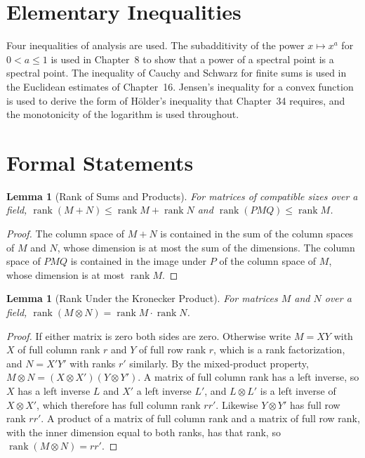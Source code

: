 \documentclass[11pt,letterpaper]{report}
\theoremstyle{plain}
\newtheorem{lemma}[theorem]{Lemma}
\theoremstyle{definition}
\theoremstyle{remark}
\begin{document}
\section{Elementary Inequalities}

Four inequalities of analysis are used. The subadditivity of the power $x\mapsto x^a$ for $0<a\le1$ is used in Chapter~8 to show that a power of a spectral point is a spectral point. The inequality of Cauchy and Schwarz for finite sums is used in the Euclidean estimates of Chapter~16. Jensen's inequality for a convex function is used to derive the form of H\"older's inequality that Chapter~34 requires, and the monotonicity of the logarithm is used throughout.

\section{Formal Statements}

\begin{lemma}[Rank of Sums and Products]\label{lem:ranksum}
For matrices of compatible sizes over a field, $\operatorname{rank}(M+N)\le\operatorname{rank}M+\operatorname{rank}N$ and $\operatorname{rank}(PMQ)\le\operatorname{rank}M$.
\end{lemma}
\begin{proof}
The column space of $M+N$ is contained in the sum of the column spaces of $M$ and $N$, whose dimension is at most the sum of the dimensions. The column space of $PMQ$ is contained in the image under $P$ of the column space of $M$, whose dimension is at most $\operatorname{rank}M$.
\end{proof}

\begin{lemma}[Rank Under the Kronecker Product]\label{lem:kronrank}
For matrices $M$ and $N$ over a field, $\operatorname{rank}(M\otimes N)=\operatorname{rank}M\cdot\operatorname{rank}N$.
\end{lemma}
\begin{proof}
If either matrix is zero both sides are zero. Otherwise write $M=XY$ with $X$ of full column rank $r$ and $Y$ of full row rank $r$, which is a rank factorization, and $N=X'Y'$ with ranks $r'$ similarly. By the mixed-product property, $M\otimes N=(X\otimes X')(Y\otimes Y')$. A matrix of full column rank has a left inverse, so $X$ has a left inverse $L$ and $X'$ a left inverse $L'$, and $L\otimes L'$ is a left inverse of $X\otimes X'$, which therefore has full column rank $rr'$. Likewise $Y\otimes Y'$ has full row rank $rr'$. A product of a matrix of full column rank and a matrix of full row rank, with the inner dimension equal to both ranks, has that rank, so $\operatorname{rank}(M\otimes N)=rr'$.
\end{proof}
\end{document}
